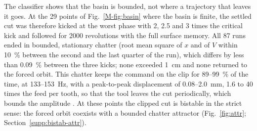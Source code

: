 The classifier shows that the basin is bounded, not where a trajectory that leaves it goes. At the 29 points of Fig.~\ref{M-fig:basin} where the basin is finite, the settled cut was therefore kicked at the worst phase with 2, 2.5 and 3 times the critical kick and followed for 2000 revolutions with the full surface memory. All 87 runs ended in bounded, stationary chatter (root mean square of $x$ and of $V$ within \SI{10}{\percent} between the second and the last quarter of the run), which differs by less than \SI{0.09}{\percent} between the three kicks; none exceeded \SI{1}{\centi\metre} and none returned to the forced orbit. This chatter keeps the command on the clip for 89--\SI{99}{\percent} of the time, at 133--\SI{153}{\hertz}, with a peak-to-peak displacement of 0.08--\SI{2.0}{\milli\metre}, 1.6 to 40 times the feed per tooth, so that the tool leaves the cut periodically, which bounds the amplitude \citep{tlusty1981basic}. At these points the clipped cut is bistable in the strict sense: the forced orbit coexists with a bounded chatter attractor (Fig.~\ref{fig:attr}; Section~\ref{supp:bistab-attr}).


